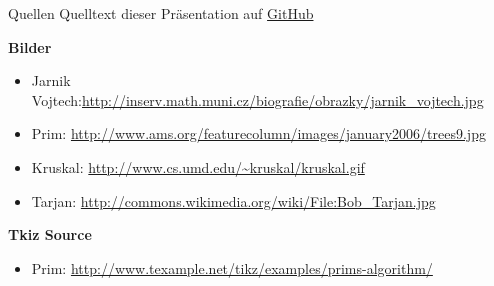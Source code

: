 \begin{frame}{Quellen}
	Quelltext dieser Präsentation auf \href{https://github.com/MartinThoma/ICPC-Referat}{GitHub}
	
	\textbf{Bilder}
	\begin{itemize}
		\item Jarnik Vojtech:\url{http://inserv.math.muni.cz/biografie/obrazky/jarnik_vojtech.jpg}
		\item Prim: \url{http://www.ams.org/featurecolumn/images/january2006/trees9.jpg}
		\item Kruskal: \url{http://www.cs.umd.edu/~kruskal/kruskal.gif}
		\item Tarjan: \url{http://commons.wikimedia.org/wiki/File:Bob_Tarjan.jpg}
	\end{itemize}
		 	
 	\textbf{Tkiz Source}
 	\begin{itemize}
 		\item Prim: \url{http://www.texample.net/tikz/examples/prims-algorithm/}
 	\end{itemize}
\end{frame}
